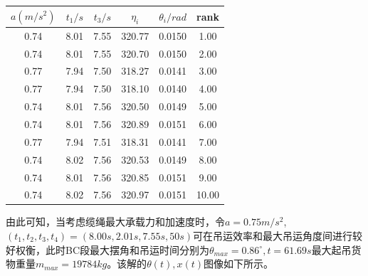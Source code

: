 \documentclass[withoutpreface,bwprint]{cumcmthesis} %
\begin{document}
\begin{table}[]
    \centering
    \begin{tabular}{|c|c|c|c|c|c|}
        \hline
    $a(m/s^2)$ & $t_1/s$ & $t_3/s$ & $\eta_i$ & $\theta_i/rad$ & rank  \\ \hline
    0.74       & 8.01  & 7.55  & 320.77                 & 0.0150                   & 1.00  \\ \hline
    0.74       & 8.01  & 7.55  & 320.70                 & 0.0150                   & 2.00  \\ \hline
    0.77       & 7.94  & 7.50  & 318.27                 & 0.0141                   & 3.00  \\ \hline
    0.77       & 7.94  & 7.50  & 318.10                 & 0.0140                   & 4.00  \\ \hline
    0.74       & 8.01  & 7.56  & 320.50                 & 0.0149                   & 5.00  \\ \hline
    0.74       & 8.01  & 7.56  & 320.89                 & 0.0151                   & 6.00  \\ \hline
    0.77       & 7.94  & 7.51  & 318.31                 & 0.0141                   & 7.00  \\ \hline
    0.74       & 8.02  & 7.56  & 320.53                 & 0.0149                   & 8.00  \\ \hline
    0.74       & 8.01  & 7.56  & 320.85                 & 0.0151                   & 9.00  \\ \hline
    0.74       & 8.02  & 7.56  & 320.97                 & 0.0151                   & 10.00 \\ \hline
    \end{tabular}
    \end{table}
\newpage
由此可知，当考虑缆绳最大承载力和加速度时，令$a=0.75m/s^2$,$(t_1,t_2,t_3,t_4)=(8.00s,2.01s,7.55s,50s)$可在吊运效率和最大吊运角度间进行较好权衡，此时BC段最大摆角和吊运时间分别为$\theta_{max}=0.86^{\circ},t=61.69s$最大起吊货物重量$m_{max}=19784kg$。该解的$\theta(t),x(t)$图像如下所示。
\end{document}

